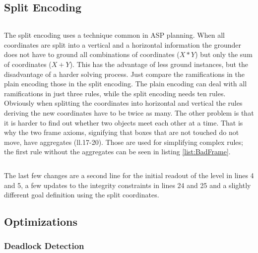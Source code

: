 \documentclass{report}
\begin{document}
\subsection{Split Encoding}

\begin{lstlisting}[caption={Split Encoding},label=list:SplitEnc]
\end{lstlisting}
The split encoding uses a technique common in ASP planning. When all coordinates are split into a vertical and a horizontal information the grounder does not have to ground all combinations of coordinates ($X * Y$) but only the sum of coordinates ($X + Y$). This has the advantage of less ground instances, but the disadvantage of a harder solving process. Just compare the ramifications in the plain encoding those in the split encoding. The plain encoding can deal with all ramifications in just three rules, while the split encoding needs ten rules. Obviously when splitting the coordinates into horizontal and vertical the rules deriving the new coordinates have to be twice as many. The other problem is that it is harder to find out whether two objects meet each other at a time. That is why the two frame axioms, signifying that boxes that are not touched do not move, have aggregates (ll.17-20). Those are used for simplifying complex rules; the first rule without the aggregates can be seen in listing \ref{list:BadFrame}.

\begin{lstlisting}[caption={Frame Axiom X},label=list:BadFrame]
\end{lstlisting}
The last few changes are a second line for the initial readout of the level in lines 4 and 5, a few updates to the integrity constraints in lines 24 and 25 and a slightly different goal definition using the split coordinates.

\subsection{Optimizations}

\subsubsection{Deadlock Detection}
\end{document}

